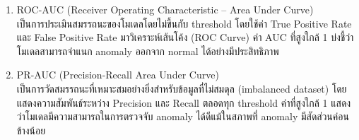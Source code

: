\begin{enumerate}
\item ROC-AUC (Receiver Operating Characteristic – Area Under Curve) \\ เป็นการประเมินสมรรถนะของโมเดลโดยไม่ขึ้นกับ threshold โดยใช้ค่า True Positive Rate และ False Positive Rate มาวิเคราะห์เส้นโค้ง (ROC Curve) ค่า AUC ที่สูงใกล้ 1 บ่งชี้ว่าโมเดลสามารถจำแนก anomaly ออกจาก normal ได้อย่างมีประสิทธิภาพ
\item PR-AUC (Precision-Recall Area Under Curve) \\ เป็นการวัดสมรรถนะที่เหมาะสมอย่างยิ่งสำหรับข้อมูลที่ไม่สมดุล (imbalanced dataset) โดยแสดงความสัมพันธ์ระหว่าง Precision และ Recall ตลอดทุก threshold ค่าที่สูงใกล้ 1 แสดงว่าโมเดลมีความสามารถในการตรวจจับ anomaly ได้ดีแม้ในสภาพที่ anomaly มีสัดส่วนค่อนข้างน้อย
\end{enumerate}